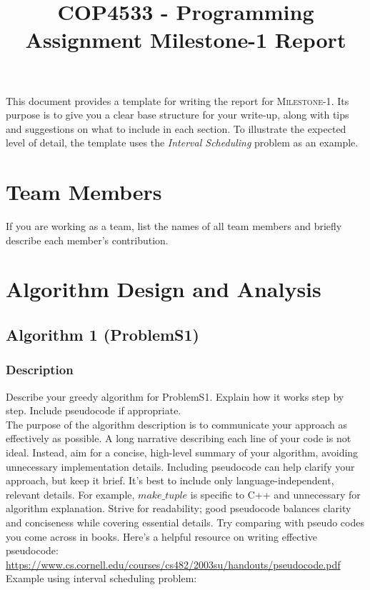 \documentclass{article}
\begin{document}
\title{COP4533 - Programming Assignment Milestone-1 Report}
\date{}
\maketitle
{\color{red}
This document provides a template for writing the report for \textsc{Milestone-1}.  
Its purpose is to give you a clear base structure for your write-up, along with tips and suggestions on what to include in each section.  
To illustrate the expected level of detail, the template uses the \textit{Interval Scheduling} problem as an example. 
}

\section{Team Members}
{\color{red} If you are working as a team, list the names of all team members and briefly describe each member's contribution.}

\section{Algorithm Design and Analysis}

\subsection{Algorithm 1 (ProblemS1)}

\subsubsection{Description}
{\color{red} Describe your greedy algorithm for ProblemS1. Explain how it works step by step. Include pseudocode if appropriate.\\

The purpose of the algorithm description is to communicate your approach as effectively as possible. A long narrative describing each line of your code is not ideal. Instead, aim for a concise, high-level summary of your algorithm, avoiding unnecessary implementation details. Including pseudocode can help clarify your approach, but keep it brief. It’s best to include only language-independent, relevant details. For example, $make\_tuple$ is specific to C++ and unnecessary for algorithm explanation. Strive for readability; good pseudocode balances clarity and conciseness while covering essential details. Try comparing with pseudo codes you come across in books. Here’s a helpful resource on writing effective pseudocode: 
 \url{https://www.cs.cornell.edu/courses/cs482/2003su/handouts/pseudocode.pdf}\\

Example using interval scheduling problem: \\}
\end{document}
